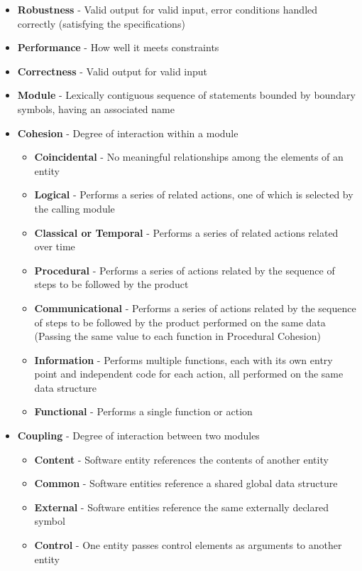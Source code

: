 \documentclass{report}
\begin{document}
\begin{itemize}
		\item \textbf{Robustness} - Valid output for valid input, error conditions handled correctly (satisfying the specifications)
		\item \textbf{Performance} - How well it meets constraints
		\item \textbf{Correctness} - Valid output for valid input
		\item \textbf{Module} - Lexically contiguous sequence of statements bounded by boundary symbols, having an associated name
		\item \textbf{Cohesion} - Degree of interaction within a module
			\begin{itemize}
				\item \textbf{Coincidental} - No meaningful relationships among the elements of an entity
				\item \textbf{Logical} - Performs a series of related actions, one of which is selected by the calling module
				\item \textbf{Classical or Temporal} - Performs a series of related actions related over time
				\item \textbf{Procedural} - Performs a series of actions related by the sequence of steps to be followed by the product
				\item \textbf{Communicational} - Performs a series of actions related by the sequence of steps to be followed by the product performed on the same data (Passing the same value to each function in Procedural Cohesion)
				\item \textbf{Information} - Performs multiple functions, each with its own entry point and independent code for each action, all performed on the same data structure
				\item \textbf{Functional} - Performs a single function or action
			\end{itemize}
		\item \textbf{Coupling} - Degree of interaction between two modules
			\begin{itemize}
				\item \textbf{Content} - Software entity references the contents of another entity
				\item \textbf{Common} - Software entities reference a shared global data structure
				\item \textbf{External} - Software entities reference the same externally declared symbol
				\item \textbf{Control} - One entity passes control elements as arguments to another entity

\end{itemize}
\end{itemize}
\end{document}
